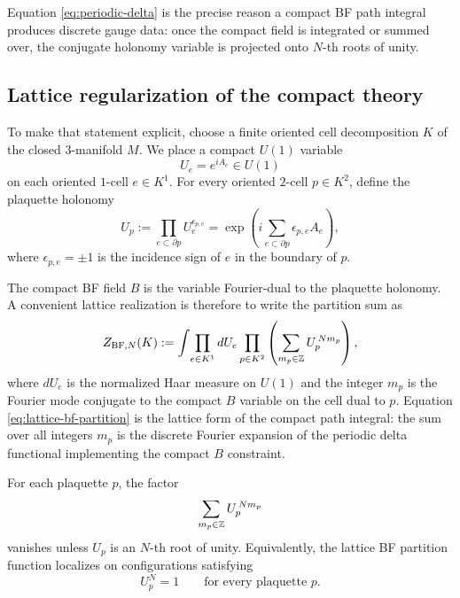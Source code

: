 \medskip

\noindent Equation \eqref{eq:periodic-delta} is the precise reason a compact BF path integral produces discrete gauge data: once the compact field is integrated or summed over, the conjugate holonomy variable is projected onto $N$-th roots of unity.

\subsection{Lattice regularization of the compact theory}

To make that statement explicit, choose a finite oriented cell decomposition $K$ of the closed $3$-manifold $M$. We place a compact $U(1)$ variable
\begin{equation*}
U_e = e^{iA_e}\in U(1)
\end{equation*}
on each oriented $1$-cell $e\in K^1$. For every oriented $2$-cell $p\in K^2$, define the plaquette holonomy
\begin{equation}\label{eq:plaquette-holonomy}
U_p := \prod_{e\subset \partial p} U_e^{\epsilon_{p,e}}
=
\exp\!\left(i\sum_{e\subset \partial p}\epsilon_{p,e}A_e\right),
\end{equation}
where $\epsilon_{p,e}=\pm 1$ is the incidence sign of $e$ in the boundary of $p$.

\medskip

\noindent The compact BF field $B$ is the variable Fourier-dual to the plaquette holonomy. A convenient lattice realization is therefore to write the partition sum as
\begin{equation}\label{eq:lattice-bf-partition}
Z_{\mathrm{BF},N}(K)
:=
\int\!\prod_{e\in K^1} dU_e
\prod_{p\in K^2}
\left(\sum_{m_p\in \mathbb{Z}} U_p^{\,Nm_p}\right),
\end{equation}
where $dU_e$ is the normalized Haar measure on $U(1)$ and the integer $m_p$ is the Fourier mode conjugate to the compact $B$ variable on the cell dual to $p$. Equation \eqref{eq:lattice-bf-partition} is the lattice form of the compact path integral: the sum over all integers $m_p$ is the discrete Fourier expansion of the periodic delta functional implementing the compact $B$ constraint.

\begin{proposition}\label{prop:bf-root-unity}
For each plaquette $p$, the factor
\begin{equation}\label{eq:root-unity-projector}
\sum_{m_p\in \mathbb{Z}} U_p^{\,Nm_p}
\end{equation}
vanishes unless $U_p$ is an $N$-th root of unity. Equivalently, the lattice BF partition function localizes on configurations satisfying
\begin{equation}\label{eq:Up-N}
U_p^N = 1
\qquad
\text{for every plaquette }p.
\end{equation}
\end{proposition}

